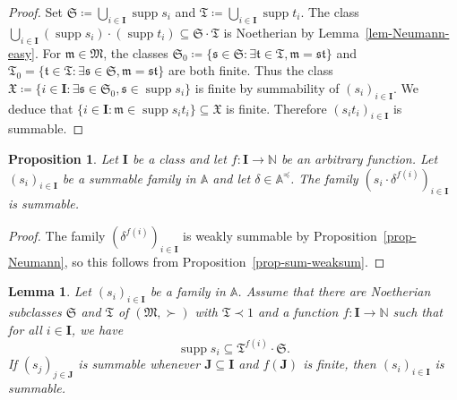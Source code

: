 \documentclass{article}
\newcommand{\assign}{\coloneqq}
\newcommand{\of}{:}
\newcommand{\suchthat}{:}
\newcommand{\tmop}[1]{\ensuremath{\operatorname{#1}}}
\newtheorem{proposition}[theorem]{Proposition}
\newtheorem{lemma}[theorem]{Lemma}
\theoremstyle{remark}\newtheorem*{convention*}{Convention}
\begin{document}
\begin{proof}
  Set $\mathfrak{S} \assign \bigcup_{i \in \mathbf{I}} \tmop{supp} s_i$ and
  $\mathfrak{T} \assign \bigcup_{i \in \mathbf{I}} \tmop{supp} t_i$. The class
  $\bigcup_{i \in \mathbf{I}} (\tmop{supp} s_i) \cdot (\tmop{supp} t_i)
  \subseteq \mathfrak{S} \cdot \mathfrak{T}$ is Noetherian by
  Lemma~\ref{lem-Neumann-easy}. For $\mathfrak{m} \in \mathfrak{M}$, the classes
  $\mathfrak{S}_0 \assign \{ \mathfrak{s} \in \mathfrak{S} \suchthat \exists
  \mathfrak{t} \in \mathfrak{T}, \mathfrak{m}=\mathfrak{s}\mathfrak{t} \}$ and
  $\mathfrak{T}_0 = \{ \mathfrak{t} \in \mathfrak{T} \suchthat \exists
  \mathfrak{s} \in \mathfrak{S}, \mathfrak{m}=\mathfrak{s}\mathfrak{t} \}$ are
  both finite. Thus the class $\mathfrak{X} \assign \{ i \in \mathbf{I}
  \suchthat \exists \mathfrak{s} \in \mathfrak{S}_0, \mathfrak{s} \in
  \tmop{supp} s_i \}$ is finite by summability of $(s_i)_{i \in \mathbf{I}}$.
  We deduce that $\{ i \in \mathbf{I} \suchthat \mathfrak{m} \in \tmop{supp}
  s_i t_i \} \subseteq \mathfrak{X}$ is finite. Therefore $(s_i t_i)_{i \in
  \mathbf{I}}$ is summable.
\end{proof}

\begin{proposition}
  \label{prop-adding-finite-factors}Let $\mathbf{I}$ be a class and let $f \of
  \mathbf{I} \longrightarrow \mathbb{N}$ be an arbitrary function. Let
  $(s_i)_{i \in \mathbf{I}}$ be a summable family in $\mathbb{A}$ and let
  $\delta \in \mathbb{A}^{\preccurlyeq}$. The family $(s_i \cdot \delta^{f
  (i)})_{i \in \mathbf{I}}$ is summable.
\end{proposition}

\begin{proof}
  The family $(\delta^{f (i)})_{i \in \mathbf{I}}$ is weakly summable by
  Proposition~\ref{prop-Neumann}, so this follows from Proposition~\ref{prop-sum-weaksum}.
\end{proof}

\begin{lemma}
  \label{lem-well-based-fin-family}Let $(s_i)_{i \in \mathbf{I}}$ be a family
  in $\mathbb{A}$. Assume that there are Noetherian subclasses $\mathfrak{S}$
  and $\mathfrak{T}$ of $(\mathfrak{M}, \succ)$ with $\mathfrak{T} \prec 1$
  and a function $f \of \mathbf{I} \longrightarrow \mathbb{N}$ such that for
  all $i \in \mathbf{I}$, we have
  \[ \tmop{supp} s_i \subseteq \mathfrak{T}^{f (i)} \cdot \mathfrak{S}. \]
  If $(s_j)_{j \in \mathbf{J}}$ is summable whenever $\mathbf{J} \subseteq
  \mathbf{I}$ and $f (\mathbf{J})$ is finite, then $(s_i)_{i \in \mathbf{I}}$
  is summable.
\end{lemma}
\end{document}
